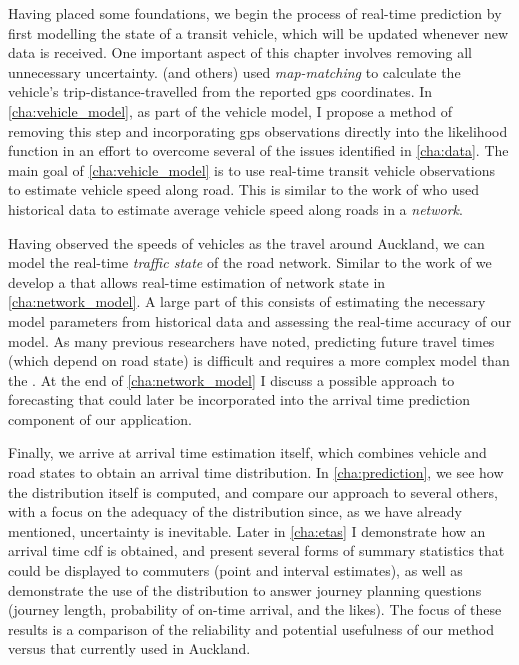 Having placed some foundations, we begin the process of real-time prediction by first modelling the state of a transit vehicle, which will be updated whenever new data is received. One important aspect of this chapter involves removing all unnecessary uncertainty.  (and others) used \emph{map-matching} to calculate the vehicle's trip-distance-travelled from the reported \gls{gps} coordinates. In \cref{cha:vehicle_model}, as part of the vehicle model, I propose a method of removing this step and incorporating \gls{gps} observations directly into the likelihood function in an effort to overcome several of the issues identified in \cref{cha:data}. The main goal of \cref{cha:vehicle_model} is to use real-time transit vehicle observations to estimate vehicle speed along road. This is similar to the work of \citet{Celan_2017,Celan_2018} who used historical data to estimate average vehicle speed along roads in a \emph{network}.


Having observed the speeds of vehicles as the travel around Auckland, we can model the real-time \emph{traffic state} of the road network. Similar to the work of \citet{Shalaby_2004} we develop a \kf{} that allows real-time estimation of network state in \cref{cha:network_model}. A large part of this consists of estimating the necessary model parameters from historical data and assessing the real-time accuracy of our model. As many previous researchers have noted, predicting future travel times (which depend on road state) is difficult and requires a more complex model than the \kf{}. At the end of \cref{cha:network_model} I discuss a possible approach to forecasting that could later be incorporated into the arrival time prediction component of our application.


Finally, we arrive at arrival time estimation itself, which combines vehicle and road states to obtain an arrival time distribution. In \cref{cha:prediction}, we see how the distribution itself is computed, and compare our approach to several others, with a focus on the adequacy of the distribution since, as we have already mentioned, uncertainty is inevitable. Later in \cref{cha:etas} I demonstrate how an arrival time \gls{cdf} is obtained, and present several forms of summary statistics that could be displayed to commuters (point and interval estimates), as well as demonstrate the use of the distribution to answer journey planning questions (journey length, probability of on-time arrival, and the likes). The focus of these results is a comparison of the reliability and potential usefulness of our method versus that currently used in Auckland.


